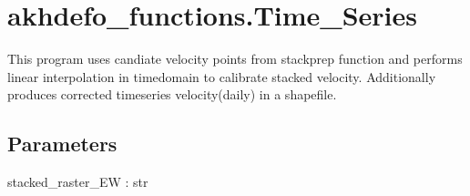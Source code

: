 \documentclass[letterpaper,10pt]{sphinxmanual}
\begin{document}
\sphinxstepscope


\chapter{akhdefo\_functions.Time\_Series}
\label{\detokenize{generated/akhdefo_functions.Time_Series:akhdefo-functions-time-series}}\label{\detokenize{generated/akhdefo_functions.Time_Series::doc}}

\begin{fulllineitems}
\label{\detokenize{generated/akhdefo_functions.Time_Series:akhdefo_functions.Time_Series}}
\pysigstartsignatures
{}
\pysigstopsignatures
\sphinxAtStartPar
This program uses candiate velocity points from stackprep function and performs linear interpolation in time\sphinxhyphen{}domain to calibrate
stacked velocity. Additionally produces corrected timeseries velocity(daily) in a shapefile.


\section{Parameters}
\label{\detokenize{generated/akhdefo_functions.Time_Series:parameters}}
\sphinxAtStartPar
stacked\_raster\_EW : str


\end{fulllineitems}
\end{document}

